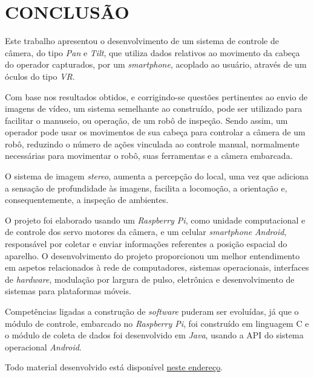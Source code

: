 
\chapter{CONCLUSÃO}
\label{chap:conclusao}

Este trabalho apresentou o desenvolvimento de um sistema de controle de câmera, do tipo \textit{Pan} e \textit{Tilt}, que utiliza dados relativos ao movimento da cabeça do operador capturados, por um \textit{smartphone}, acoplado ao usuário, através de um óculos do tipo \textit{VR}.\par

Com base nos resultados obtidos, e corrigindo-se questões pertinentes ao envio de imagens de vídeo, um sistema semelhante ao construído, pode ser utilizado para facilitar o manuseio, ou operação, de um robô de inspeção. Sendo assim, um operador pode usar os movimentos de sua cabeça para controlar a câmera de um robô, reduzindo o número de ações vinculada ao controle manual, normalmente necessárias para movimentar o robô, suas ferramentas e a câmera embarcada. \par 
O sistema de imagem \textit{stereo}, aumenta a percepção do local, uma vez que adiciona a sensação de profundidade às imagens, facilita a locomoção, a orientação e, consequentemente, a inspeção de ambientes.

O projeto foi elaborado usando um \textit{Raspberry Pi}, como unidade computacional e de controle dos servo motores da câmera, e um celular \textit{smartphone} \textit{Android}, responsável por coletar e enviar informações referentes a posição espacial do aparelho. O desenvolvimento do projeto proporcionou um melhor entendimento em aspetos relacionados à rede de computadores, sistemas operacionais, interfaces de \textit{hardware}, modulação por largura de pulso, eletrônica e desenvolvimento de sistemas para plataformas móveis.\par

Competências ligadas a construção de \textit{software} puderam ser evoluídas, já que o módulo de controle, embarcado no \textit{Raspberry Pi}, foi construído em linguagem C e o módulo de coleta de dados foi desenvolvido em \textit{Java}, usando a API do sistema operacional \textit{Android}.\par

Todo material desenvolvido está disponível \href{https://github.com/raffsalvetti/ENGG60}{neste endereço}.


